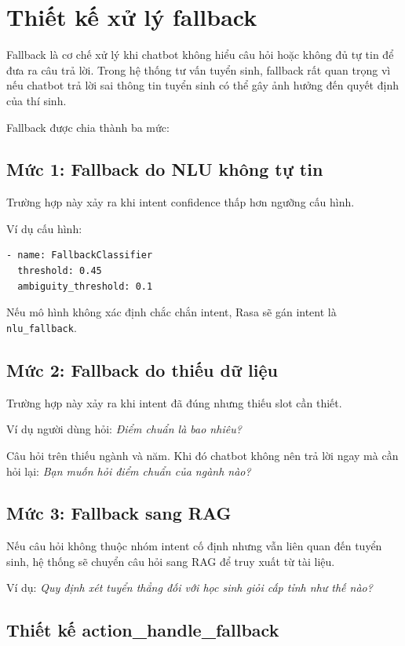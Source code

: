 ﻿\section{Thiết kế xử lý fallback}

Fallback là cơ chế xử lý khi chatbot không hiểu câu hỏi hoặc không đủ tự tin để đưa ra câu trả lời. Trong hệ thống tư vấn tuyển sinh, fallback rất quan trọng vì nếu chatbot trả lời sai thông tin tuyển sinh có thể gây ảnh hưởng đến quyết định của thí sinh.

Fallback được chia thành ba mức:

\subsection*{Mức 1: Fallback do NLU không tự tin}

Trường hợp này xảy ra khi intent confidence thấp hơn ngưỡng cấu hình.

Ví dụ cấu hình:

\begin{verbatim}
- name: FallbackClassifier
  threshold: 0.45
  ambiguity_threshold: 0.1
\end{verbatim}

Nếu mô hình không xác định chắc chắn intent, Rasa sẽ gán intent là \texttt{nlu\_fallback}.

\subsection*{Mức 2: Fallback do thiếu dữ liệu}

Trường hợp này xảy ra khi intent đã đúng nhưng thiếu slot cần thiết.

Ví dụ người dùng hỏi: \textit{Điểm chuẩn là bao nhiêu?}

Câu hỏi trên thiếu ngành và năm. Khi đó chatbot không nên trả lời ngay mà cần hỏi lại: \textit{Bạn muốn hỏi điểm chuẩn của ngành nào?}

\subsection*{Mức 3: Fallback sang RAG}

Nếu câu hỏi không thuộc nhóm intent cố định nhưng vẫn liên quan đến tuyển sinh, hệ thống sẽ chuyển câu hỏi sang RAG để truy xuất từ tài liệu.

Ví dụ: \textit{Quy định xét tuyển thẳng đối với học sinh giỏi cấp tỉnh như thế nào?}

\subsection*{Thiết kế action\_handle\_fallback}


